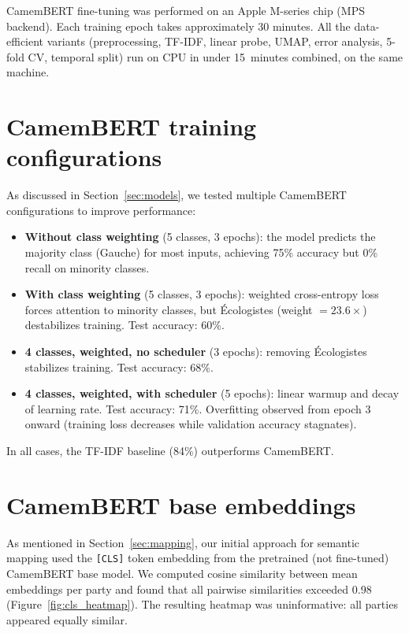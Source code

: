 \documentclass{article}
\begin{document}
CamemBERT fine-tuning was performed on an Apple M-series chip (MPS backend). Each training epoch takes approximately 30 minutes. All the data-efficient variants (preprocessing, TF-IDF, linear probe, UMAP, error analysis, 5-fold CV, temporal split) run on CPU in under 15~minutes combined, on the same machine.

\newpage
\section{CamemBERT training configurations}
\label{app:training}

As discussed in Section~\ref{sec:models}, we tested multiple CamemBERT configurations to improve performance:

\begin{itemize}
    \item \textbf{Without class weighting} (5 classes, 3 epochs): the model predicts the majority class (Gauche) for most inputs, achieving 75\% accuracy but 0\% recall on minority classes.
    \item \textbf{With class weighting} (5 classes, 3 epochs): weighted cross-entropy loss forces attention to minority classes, but \'{E}cologistes (weight $= 23.6\times$) destabilizes training. Test accuracy: 60\%.
    \item \textbf{4 classes, weighted, no scheduler} (3 epochs): removing \'{E}cologistes stabilizes training. Test accuracy: 68\%.
    \item \textbf{4 classes, weighted, with scheduler} (5 epochs): linear warmup and decay of learning rate. Test accuracy: 71\%. Overfitting observed from epoch 3 onward (training loss decreases while validation accuracy stagnates).
\end{itemize}

In all cases, the TF-IDF baseline (84\%) outperforms CamemBERT.

\newpage
\section{CamemBERT base embeddings}
\label{app:cls_failure}

As mentioned in Section~\ref{sec:mapping}, our initial approach for semantic mapping used the \texttt{[CLS]} token embedding from the pretrained (not fine-tuned) CamemBERT base model. We computed cosine similarity between mean embeddings per party and found that all pairwise similarities exceeded 0.98 (Figure~\ref{fig:cls_heatmap}). The resulting heatmap was uninformative: all parties appeared equally similar.
\end{document}
